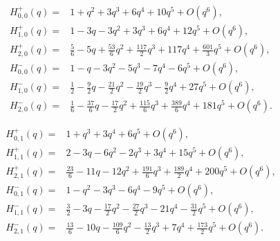 \documentclass[12pt,reqno]{amsart}
\theoremstyle{definition}
\def\cO{O}
\begin{document}
  \begin{equation}
    \begin{aligned}
      H_{0,0}^{+}(q) =
      &1+q^2+3q^3+6q^4+10q^5+\cO(q^6),\\
      H_{1,0}^{+}(q) =
      &1-3q-3q^2+3q^3+6q^4+12q^5+\cO(q^6),\\
      H_{2,0}^{+}(q) =
      &\frac{5}{6}-5q+\frac{53}{6}q^2+\frac{117}{2}q^3+117q^4
      +\frac{601}{3}q^5+\cO(q^6),\\
      H_{0,0}^{-}(q) =
      &1-q-3q^2-5q^3-7q^4-6q^5+\cO(q^6),\\
      H_{1,0}^{-}(q) =
      &\frac{1}{2}-\frac{9}{2}q-\frac{21}{2}q^2-\frac{19}{2}q^3
      -\frac{9}{2}q^4+27q^5+\cO(q^6),\\
      H_{2,0}^{-}(q) =
      &\frac{1}{6}-\frac{37}{6}q-\frac{17}{2}q^2+\frac{115}{6}q^3
      +\frac{389}{6}q^4+181q^5+\cO(q^6).
    \end{aligned}
  \end{equation}

  \begin{equation}
    \begin{aligned}
      H_{0,1}^{+}(q) =
      &1+q^3+3q^4+6q^5+\cO(q^6),\\
      H_{1,1}^{+}(q) =
      &2-3q-6q^2-2q^3+3q^4+15q^5+\cO(q^6),\\
      H_{2,1}^{+}(q) =
      &\frac{23}{6}-11q-12q^2+\frac{191}{6}q^3+\frac{189}{2}q^4
      +200q^5+\cO(q^6),\\
      H_{0,1}^{-}(q) =
      &1-q^2-3q^3-6q^4-9q^5+\cO(q^6),\\
      H_{1,1}^{-}(q) =
      &\frac{3}{2}-3q-\frac{17}{2}q^2-\frac{27}{2}q^3-21q^4
      -\frac{31}{2}q^5+\cO(q^6),\\
      H_{2,1}^{-}(q) =
      &\frac{13}{6}-10q-\frac{109}{6}q^2-\frac{13}{2}q^3+7q^4
      +\frac{173}{2}q^5+\cO(q^6).
    \end{aligned}
  \end{equation}
  
\end{document}
